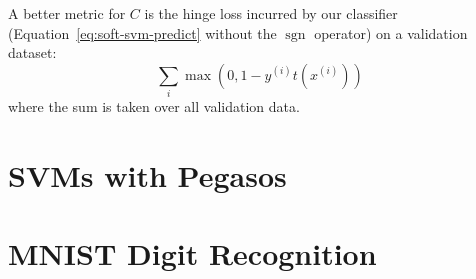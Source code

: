 \documentclass{article}
\DeclareMathOperator{\sgn}{sgn}
\newcommand{\sind}[1]{^{(#1)}}
\begin{document}
\begin{multicols}{2}
A better metric for $C$ is
the hinge loss incurred by our classifier
(Equation~\ref{eq:soft-svm-predict} without the $\sgn$ operator)
on a validation dataset:
\begin{equation}
    \sum_{i} \max(0, 1 - y\sind{i} t(x\sind{i}))
\end{equation}
where the sum is taken over all validation data.






\section{SVMs with Pegasos}


\section{MNIST Digit Recognition}


\end{multicols}
\end{document}
